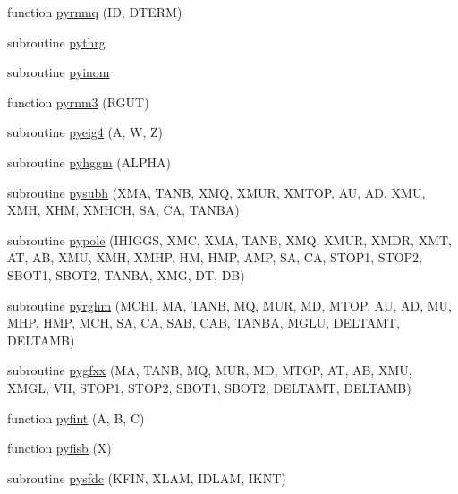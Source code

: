 \begin{DoxyCompactItemize}
function \hyperlink{pythia-6_84_824_8f_ab299461aa924b8fbcdf024c6208aca16}{pyrnmq} (I\+D, D\+T\+E\+R\+M)
\item 
subroutine \hyperlink{pythia-6_84_824_8f_ae158d47b60e51c8ce75393f8688541f5}{pythrg}
\item 
subroutine \hyperlink{pythia-6_84_824_8f_aa7bdd8484862c65022c351660e12f59f}{pyinom}
\item 
function \hyperlink{pythia-6_84_824_8f_a705b41dadabcda252bc3016ab7637a1c}{pyrnm3} (R\+G\+U\+T)
\item 
subroutine \hyperlink{pythia-6_84_824_8f_afebb24c57866a2c33d3fcd7dde0a92a9}{pyeig4} (A, W, Z)
\item 
subroutine \hyperlink{pythia-6_84_824_8f_a2f18cde517352a5c3f7bc2ee36b024f6}{pyhggm} (A\+L\+P\+H\+A)
\item 
subroutine \hyperlink{pythia-6_84_824_8f_a7e535453f3a2ab99f6de4132a7832ca7}{pysubh} (X\+M\+A, T\+A\+N\+B, X\+M\+Q, X\+M\+U\+R, X\+M\+T\+O\+P, A\+U, A\+D, X\+M\+U, X\+M\+H, X\+H\+M, X\+M\+H\+C\+H, S\+A, C\+A, T\+A\+N\+B\+A)
\item 
subroutine \hyperlink{pythia-6_84_824_8f_a6b22add9875061c72765412e8677c643}{pypole} (I\+H\+I\+G\+G\+S, X\+M\+C, X\+M\+A, T\+A\+N\+B, X\+M\+Q, X\+M\+U\+R, X\+M\+D\+R, X\+M\+T, A\+T, A\+B, X\+M\+U, X\+M\+H, X\+M\+H\+P, H\+M, H\+M\+P, A\+M\+P, S\+A, C\+A, S\+T\+O\+P1, S\+T\+O\+P2, S\+B\+O\+T1, S\+B\+O\+T2, T\+A\+N\+B\+A, X\+M\+G, D\+T, D\+B)
\item 
subroutine \hyperlink{pythia-6_84_824_8f_a623bc0a2928b826db2adab2e3c046236}{pyrghm} (M\+C\+H\+I, M\+A, T\+A\+N\+B, M\+Q, M\+U\+R, M\+D, M\+T\+O\+P, A\+U, A\+D, M\+U, M\+H\+P, H\+M\+P, M\+C\+H, S\+A, C\+A, S\+A\+B, C\+A\+B, T\+A\+N\+B\+A, M\+G\+L\+U, D\+E\+L\+T\+A\+M\+T, D\+E\+L\+T\+A\+M\+B)
\item 
subroutine \hyperlink{pythia-6_84_824_8f_a2b64fdfa9f23edaf0725fc21687a97f1}{pygfxx} (M\+A, T\+A\+N\+B, M\+Q, M\+U\+R, M\+D, M\+T\+O\+P, A\+T, A\+B, X\+M\+U, X\+M\+G\+L, V\+H, S\+T\+O\+P1, S\+T\+O\+P2, S\+B\+O\+T1, S\+B\+O\+T2, D\+E\+L\+T\+A\+M\+T, D\+E\+L\+T\+A\+M\+B)
\item 
function \hyperlink{pythia-6_84_824_8f_a369d7e63cec7143fa767be7fa08b89a9}{pyfint} (A, B, C)
\item 
function \hyperlink{pythia-6_84_824_8f_a32f0801512389f79c516bff896178a3e}{pyfisb} (X)
\item 
subroutine \hyperlink{pythia-6_84_824_8f_a900077d4b755202f49fd8971336b5721}{pysfdc} (K\+F\+I\+N, X\+L\+A\+M, I\+D\+L\+A\+M, I\+K\+N\+T)
\item 

\end{DoxyCompactItemize}
